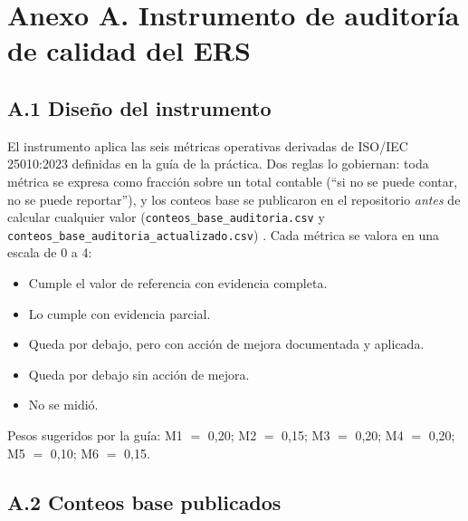 \section*{Anexo A. Instrumento de auditor\'ia de calidad del ERS}

\subsection*{A.1 Dise\~no del instrumento}

El instrumento aplica las seis m\'etricas operativas derivadas de ISO/IEC 25010:2023 definidas en la gu\'ia de la pr\'actica. Dos reglas lo gobiernan: toda m\'etrica se expresa como fracci\'on sobre un total contable (``si no se puede contar, no se puede reportar''), y los conteos base se publicaron en el repositorio \emph{antes} de calcular cualquier valor (\texttt{conteos\_base\_auditoria.csv} y \texttt{conteos\_base\_auditoria\_actualizado.csv}) \cite{iso25010,wohlin2012}. Cada m\'etrica se valora en una escala de 0 a 4:

\begin{itemize}[leftmargin=0.9cm]
  \item[4] Cumple el valor de referencia con evidencia completa.
  \item[3] Lo cumple con evidencia parcial.
  \item[2] Queda por debajo, pero con acci\'on de mejora documentada y aplicada.
  \item[1] Queda por debajo sin acci\'on de mejora.
  \item[0] No se midi\'o.
\end{itemize}

\noindent Pesos sugeridos por la gu\'ia: M1 $=$ 0,20; M2 $=$ 0,15; M3 $=$ 0,20; M4 $=$ 0,20; M5 $=$ 0,10; M6 $=$ 0,15.

\subsection*{A.2 Conteos base publicados}

